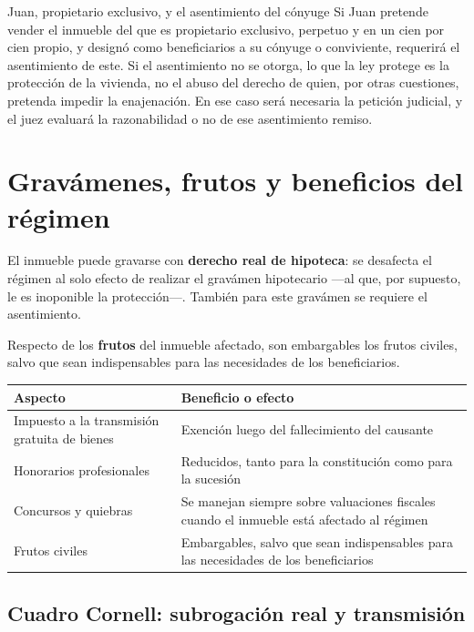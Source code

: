 \documentclass[12pt,oneside]{book}
\begin{document}
\begin{example}{Juan, propietario exclusivo, y el asentimiento del c\'onyuge}
Si Juan pretende vender el inmueble del que es propietario exclusivo, perpetuo y en un cien por cien propio, y design\'o como beneficiarios a su c\'onyuge o conviviente, requerir\'a el asentimiento de este. Si el asentimiento no se otorga, lo que la ley protege es la protecci\'on de la vivienda, no el abuso del derecho de quien, por otras cuestiones, pretenda impedir la enajenaci\'on. En ese caso ser\'a necesaria la petici\'on judicial, y el juez evaluar\'a la razonabilidad o no de ese asentimiento remiso.
\end{example}

\section{Grav\'amenes, frutos y beneficios del r\'egimen}

El inmueble puede gravarse con \textbf{derecho real de hipoteca}: se desafecta el r\'egimen al solo efecto de realizar el grav\'amen hipotecario ---al que, por supuesto, le es inoponible la protecci\'on---. Tambi\'en para este grav\'amen se requiere el asentimiento.

Respecto de los \textbf{frutos} del inmueble afectado, son embargables los frutos civiles, salvo que sean indispensables para las necesidades de los beneficiarios.

\begin{table}[H]
\centering
\begin{tabularx}{\textwidth}{>{\raggedright\arraybackslash}p{} >{\raggedright\arraybackslash}X}
\toprule
\textbf{Aspecto} & \textbf{Beneficio o efecto} \\
\midrule
Impuesto a la transmisi\'on gratuita de bienes & Exenci\'on luego del fallecimiento del causante \\
Honorarios profesionales & Reducidos, tanto para la constituci\'on como para la sucesi\'on \\
Concursos y quiebras & Se manejan siempre sobre valuaciones fiscales cuando el inmueble est\'a afectado al r\'egimen \\
Frutos civiles & Embargables, salvo que sean indispensables para las necesidades de los beneficiarios \\
\bottomrule
\end{tabularx}
\end{table}

\subsection*{Cuadro Cornell: subrogaci\'on real y transmisi\'on}
\end{document}
